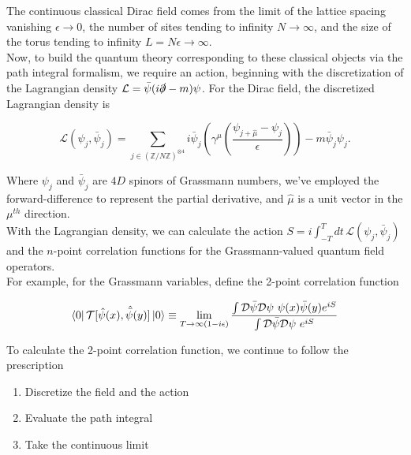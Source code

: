 \noindent The continuous classical Dirac field comes from the limit of the lattice spacing vanishing $\epsilon \rightarrow 0$, the number of sites tending to infinity $N \rightarrow \infty$, and the size of the torus tending to infinity $L = N \epsilon \rightarrow \infty$. \\

\noindent Now, to build the quantum theory corresponding to these classical objects via the path integral formalism, we require an action, beginning with the discretization of the Lagrangian density $\mathcal{L} = \bar{\psi} ( i \slashed{\partial} - m ) \psi$. For the Dirac field, the discretized Lagrangian density is

\begin{equation}
\mathcal{L} (\psi_j, \bar{\psi}_j ) = \sum_{j \in ( \mathbb{Z}/N\mathbb{Z})^{\otimes 4}} i \bar{\psi}_j \left( \gamma^\mu \left( \frac{\psi_{j + \hat{\mu}} - \psi_j}{\epsilon} \right) \right) - m \bar{\psi}_j \psi_j.
\end{equation}

\noindent Where $\psi_j$ and $\bar{\psi}_j$ are $4D$ spinors of Grassmann numbers, we've employed the forward-difference to represent the partial derivative, and $\hat{\mu}$ is a unit vector in the $\mu^{th}$ direction. \\

\noindent With the Lagrangian density, we can calculate the action $S = i \int^T_{-T} dt \, \mathcal{L}(\psi_j, \bar{\psi}_j )$ and the $n$-point correlation functions for the Grassmann-valued quantum field operators. \\

\noindent For example, for the Grassmann variables, define the 2-point correlation function

\begin{equation}
\bra{0} \mathcal{T} [ \hat{\psi} (x), \hat{\bar{\psi}} (y) ] \ket{0} \equiv \lim_{T \rightarrow \infty (1-i \epsilon)} \frac{\int \mathcal{D} \bar{\psi} \mathcal{D} \psi \,\, \psi(x) \bar{\psi} (y) e^{iS}}{\int \mathcal{D} \bar{\psi} \mathcal{D} \psi \,\, e^{iS}}
\end{equation}

\noindent To calculate the 2-point correlation function, we continue to follow the prescription

\begin{enumerate}
\item Discretize the field and the action
\item Evaluate the path integral
\item Take the continuous limit
\end{enumerate}

